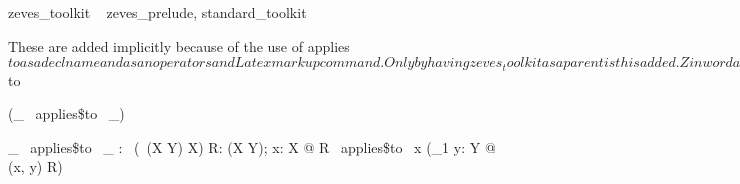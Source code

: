 \begin{zsection}
  \SECTION zeves\_toolkit \parents~ zeves\_prelude, standard\_toolkit %
\end{zsection}

These are added implicitly because of the use of applies$to as a decl name and as an operators and Latex markup command.
Only by having zeves_toolkit as a parent is this added.
%
Zinword applies\$to applies$to
\begin{zed}
   \relation (\_ ~applies\$to~ \_)
\end{zed}

\begin{gendef}[X, Y]
   \_ ~applies\$to~ \_ : \power~(\power~(X \cross Y) \cross X)
\where
   \forall R: \power(X \cross Y); x: X @ R ~applies\$to~ x \iff (\exists_1 y: Y @ (x, y) \in R)
\end{gendef}

